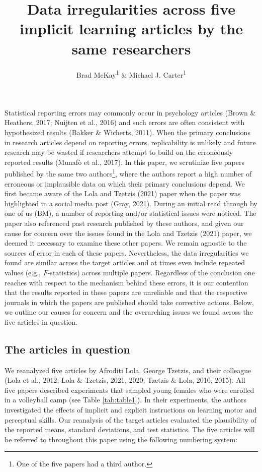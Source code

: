 \documentclass[
  english,
  man,floatsintext]{apa7}
\title{Data irregularities across five implicit learning articles by the same researchers}
\author{Brad McKay\textsuperscript{1} \& Michael J. Carter\textsuperscript{1}}
\date{}
\affiliation{\vspace{0.5cm}\textsuperscript{1} Department of Kinesiology, McMaster University}
\begin{document}
\maketitle

Statistical reporting errors may commonly occur in psychology articles (Brown \& Heathers, 2017; Nuijten et al., 2016) and such errors are often consistent with hypothesized results (Bakker \& Wicherts, 2011). When the primary conclusions in research articles depend on reporting errors, replicability is unlikely and future research may be wasted if researchers attempt to build on the erroneously reported results (Munafò et al., 2017). In this paper, we scrutinize five papers published by the same two authors\footnote{One of the five papers had a third author.}, where the authors report a high number of erroneous or implausible data on which their primary conclusions depend. We first became aware of the Lola and Tzetzis (2021) paper when the paper was highlighted in a social media post (Gray, 2021). During an initial read through by one of us (BM), a number of reporting and/or statistical issues were noticed. The paper also referenced past research published by these authors, and given our cause for concern over the issues found in the Lola and Tzetzis (2021) paper, we deemed it necessary to examine these other papers. We remain agnostic to the sources of error in each of these papers. Nevertheless, the data irregularities we found are similar across the target articles and at times even include repeated values (e.g., \(F\)-statistics) across multiple papers. Regardless of the conclusion one reaches with respect to the mechanism behind these errors, it is our contention that the results reported in these papers are unreliable and that the respective journals in which the papers are published should take corrective actions. Below, we outline our causes for concern and the overarching issues we found across the five articles in question.

\hypertarget{the-articles-in-question}{%
\subsection{The articles in question}\label{the-articles-in-question}}

We reanalyzed five articles by Afroditi Lola, George Tzetzis, and their colleague (Lola et al., 2012; Lola \& Tzetzis, 2021, 2020; Tzetzis \& Lola, 2010, 2015). All five papers described experiments that sampled young females who were enrolled in a volleyball camp (see Table \ref{tab:table1}). In their experiments, the authors investigated the effects of implicit and explicit instructions on learning motor and perceptual skills. Our reanalysis of the target articles evaluated the plausibility of the reported means, standard deviations, and test statistics. The five articles will be referred to throughout this paper using the following numbering system:
\end{document}

